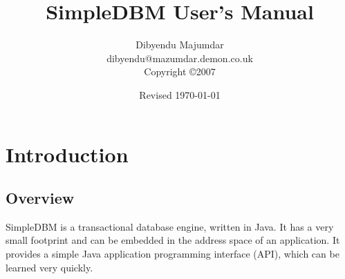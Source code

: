 \documentclass[a4paper,draft,oneside]{book}
\begin{document}
\title{SimpleDBM User's Manual}
\author{Dibyendu Majumdar\\
dibyendu@mazumdar.demon.co.uk\\
Copyright \copyright 2007}
\date{Revised \today}
\maketitle
\tableofcontents

\chapter{Introduction}

\section{Overview}
SimpleDBM is a transactional database engine, written in Java. It has a
very small footprint and can be embedded in the address space of an
application. It provides a simple Java application programming interface (API), which can be learned very quickly.
\end{document}
